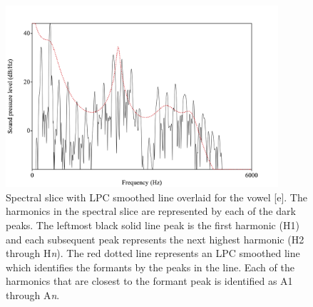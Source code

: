 \documentclass[12pt, letterpaper]{article}
\begin{document}
\begin{figure}[!h]
	\centering
	\includegraphics[width=0.9\textwidth]{../Harmonics.png}
	\caption{Spectral slice with LPC smoothed line overlaid for the vowel [e]. The harmonics in the spectral slice are represented by each of the dark peaks. The leftmost black solid line peak is the first harmonic (H1) and each subsequent peak represents the next highest harmonic (H2 through H\textit{n}). The red dotted line represents an LPC smoothed line which identifies the formants by the peaks in the line. Each of the harmonics that are closest to the formant peak is identified as A1 through A\textit{n}.}
	\label{fig:Harmonics}
\end{figure}
\vspace{-2ex}
\end{document}
